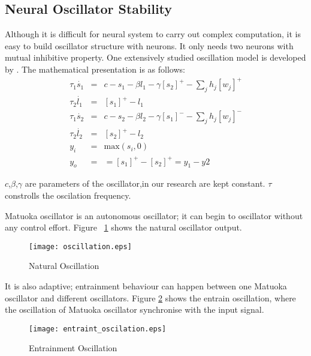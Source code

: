 \subsection{Neural Oscillator Stability}


Although it is difficult for neural system to carry out complex computation, it is easy to build oscillator structure with neurons. 
It only needs two neurons with mutual inhibitive property.
One extensively studied oscillation model is developed by \citet{neurooscillation}. 
The mathematical presentation is as follows:
\begin{eqnarray}
\tau_{1} \dot{s_{1}}&=&c-s_{1}-\beta l_{1}-\gamma [s_{2}]^{+}-\sum_{j}h_{j}[w_{j}]^{+}\\
\tau_{2} \dot{l_{1}}&=&[s_{1}]^{+}-l_{1}\\
\tau_{1} \dot{s_{2}}&=&c-s_{2}-\beta l_{2}-\gamma [s_{1}]^{-}-\sum_{j}h_{j}[w_{j}]^{-}\\
\tau_{2} \dot{l_{2}}&=&[s_{2}]^{+}-l_{2}\\
y_{i}&=&\mbox{max}(s_{i},0)\\
y_{o}&=&=[s_{1}]^{+}-[s_{2}]^{+}=y_{1}-y{2}
\label{eq:matsuta}
\end{eqnarray}

$c$,$\beta$,$\gamma$ are parameters of the oscillator,in our research are kept constant.
$\tau$ constrolls the oscilation frequency.







Matuoka oscillator is an autonomous oscillator; 
it can begin to oscillator without any control effort.
Figure ~\ref{fig:natural-oscilation} shows the natural oscillator output.
\begin{figure}[h]
\texttt{[image: oscillation.eps]}
\caption{Natural Oscillation}
\label{fig:natural-oscilation}
\end{figure}





It is also adaptive; entrainment behaviour can happen between one Matuoka oscillator and different oscillators. 
Figure \ref{fig:entraint-oscilation} shows the entrain oscillation,
where the oscillation of Matuoka oscillator synchronise with the input signal.
\begin{figure}[h]
\texttt{[image: entraint\_oscilation.eps]}
\caption{Entrainment Oscillation}
\label{fig:entraint-oscilation}
\end{figure}

